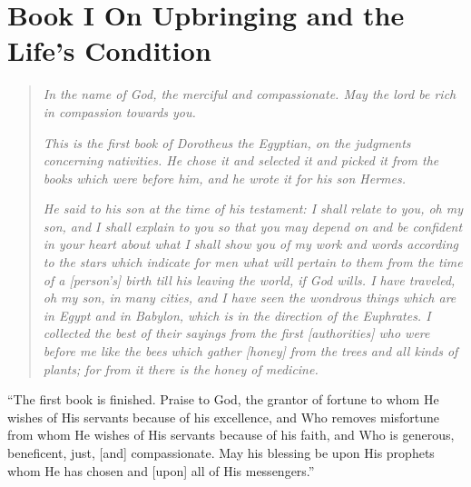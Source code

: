 \chapter[On Upbringing]{Book I On Upbringing and the Life's Condition}

\begin{quote}
\textsl{In the name of God, the merciful and compassionate. May the lord be rich in compassion towards you.}

\textsl{This is the first book of Dorotheus the Egyptian, on the judgments concerning nativities. He chose it and selected it and picked it from the books which were before him, and he wrote it for his son Hermes.}

\textsl{He said to his son at the time of his testament: I shall relate to you, oh my son, and I shall explain to you so that you may depend on and be confident in your heart about what I shall show you of my work and words according to the stars which indicate for men what will pertain to them from the time of a [person's] birth till his leaving the world, if God wills. I have traveled, oh my son, in many cities, and I have seen the wondrous things which are in Egypt and in Babylon, which is in the direction of the Euphrates. I collected the best of their sayings from the first [authorities] who were before me like the bees which gather [honey] from the trees and all kinds of plants; for from it there is the honey of medicine.}
\end{quote}





	
















``The first book is finished. Praise to God, the grantor of fortune to whom He wishes of His servants because of his excellence, and Who removes misfortune from whom He wishes of His servants because of his faith, and Who is generous, beneficent, just, [and] compassionate. May his blessing be upon His prophets whom He has chosen and [upon] all of His messengers.''
